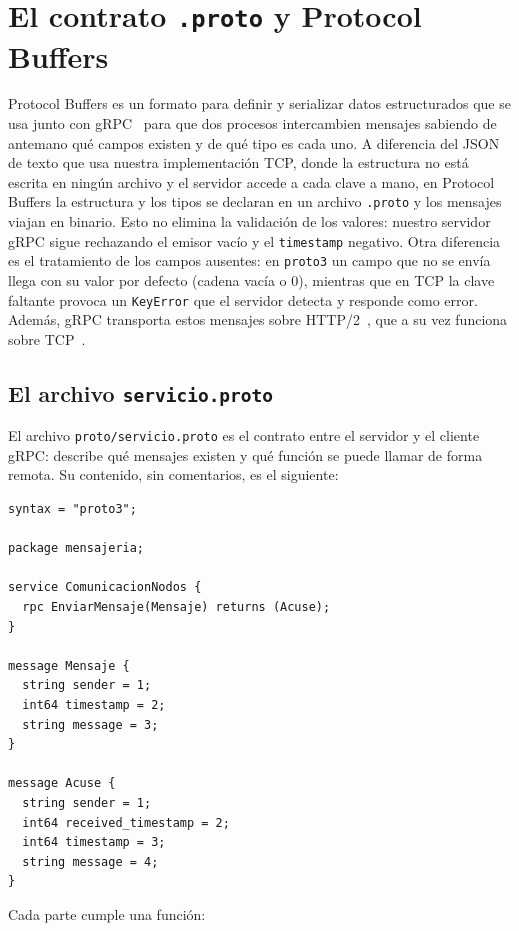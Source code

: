 \section{El contrato \texttt{.proto} y Protocol Buffers}

Protocol Buffers es un formato para definir y serializar datos estructurados
que se usa junto con gRPC~\cite{niswar2024}
para que dos procesos intercambien mensajes sabiendo de antemano qué campos
existen y de qué tipo es cada uno. A diferencia del JSON de texto que usa
nuestra implementación TCP, donde la estructura no está escrita en ningún
archivo y el servidor accede a cada clave a mano, en Protocol Buffers la
estructura y los tipos se declaran en un archivo \texttt{.proto} y los mensajes
viajan en binario. Esto no elimina la validación de los valores: nuestro
servidor gRPC sigue rechazando el emisor vacío y el \texttt{timestamp}
negativo. Otra diferencia es el tratamiento de los campos ausentes: en
\texttt{proto3} un campo que no se envía llega con su valor por defecto
(cadena vacía o 0), mientras que en TCP la clave faltante provoca un
\texttt{KeyError} que el servidor detecta y responde como error. Además, gRPC
transporta estos mensajes sobre HTTP/2~\cite{rfc9113}, que a su vez funciona
sobre TCP~\cite{rfc9293}.

\subsection{El archivo \texttt{servicio.proto}}

El archivo \texttt{proto/servicio.proto} es el contrato entre el servidor y el
cliente gRPC: describe qué mensajes existen y qué función se puede llamar de
forma remota. Su contenido, sin comentarios, es el siguiente:

\begin{verbatim}
syntax = "proto3";

package mensajeria;

service ComunicacionNodos {
  rpc EnviarMensaje(Mensaje) returns (Acuse);
}

message Mensaje {
  string sender = 1;
  int64 timestamp = 2;
  string message = 3;
}

message Acuse {
  string sender = 1;
  int64 received_timestamp = 2;
  int64 timestamp = 3;
  string message = 4;
}
\end{verbatim}

Cada parte cumple una función:

